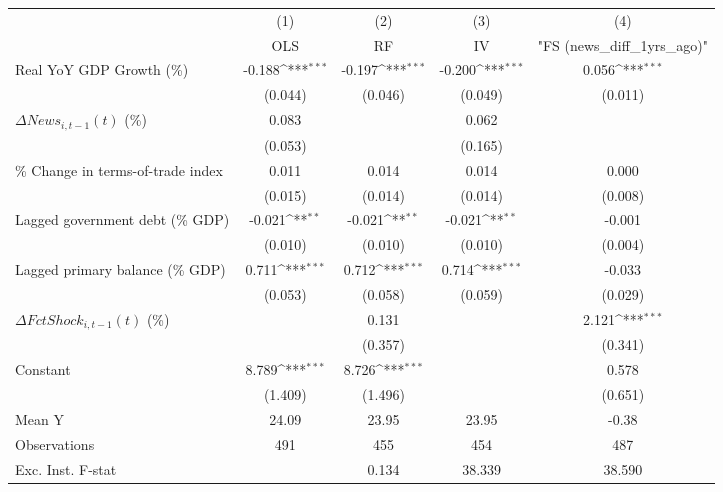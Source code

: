 {
\def\sym#1{\ifmmode^{#1}\else\(^{#1}\)\fi}
\begin{tabular}{l*{4}{c}}
\toprule
                    &\multicolumn{1}{c}{(1)}&\multicolumn{1}{c}{(2)}&\multicolumn{1}{c}{(3)}&\multicolumn{1}{c}{(4)}\\
                    &\multicolumn{1}{c}{OLS}&\multicolumn{1}{c}{RF}&\multicolumn{1}{c}{IV}&\multicolumn{1}{c}{ "FS (news_diff_1yrs_ago)" }\\
\midrule
Real YoY GDP Growth (\%)&      -0.188\sym{***}&      -0.197\sym{***}&      -0.200\sym{***}&       0.056\sym{***}\\
                    &     (0.044)         &     (0.046)         &     (0.049)         &     (0.011)         \\
\addlinespace
$ \Delta News_{i,t-1}(t)$ (\%)&       0.083         &                     &       0.062         &                     \\
                    &     (0.053)         &                     &     (0.165)         &                     \\
\addlinespace
\% Change in terms-of-trade index&       0.011         &       0.014         &       0.014         &       0.000         \\
                    &     (0.015)         &     (0.014)         &     (0.014)         &     (0.008)         \\
\addlinespace
Lagged government debt (\% GDP)&      -0.021\sym{**} &      -0.021\sym{**} &      -0.021\sym{**} &      -0.001         \\
                    &     (0.010)         &     (0.010)         &     (0.010)         &     (0.004)         \\
\addlinespace
Lagged primary balance (\% GDP)&       0.711\sym{***}&       0.712\sym{***}&       0.714\sym{***}&      -0.033         \\
                    &     (0.053)         &     (0.058)         &     (0.059)         &     (0.029)         \\
\addlinespace
$ \Delta FctShock_{i,t-1}(t)$ (\%)&                     &       0.131         &                     &       2.121\sym{***}\\
                    &                     &     (0.357)         &                     &     (0.341)         \\
\addlinespace
Constant            &       8.789\sym{***}&       8.726\sym{***}&                     &       0.578         \\
                    &     (1.409)         &     (1.496)         &                     &     (0.651)         \\
\midrule
Mean Y              &       24.09         &       23.95         &       23.95         &       -0.38         \\
Observations        &         491         &         455         &         454         &         487         \\
Exc. Inst. F-stat   &                     &       0.134         &      38.339         &      38.590         \\
\bottomrule
\end{tabular}
}
